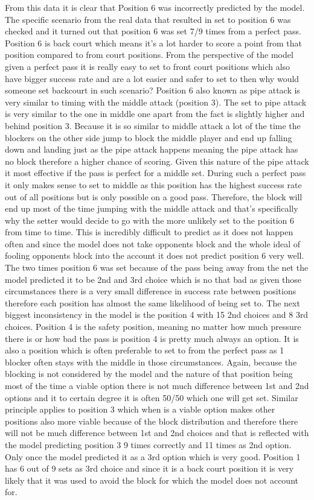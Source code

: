 \documentclass[main.tex]{subfiles}
\begin{document}
From this data it is clear that Position 6 was incorrectly predicted by the model. The specific scenario from the real data that resulted in set to position 6 was checked and it turned out that position 6 was set 7/9 times from a perfect pass. Position 6 is back court which means it’s a lot harder to score a point from that position compared to from court positions. From the perspective of the model given a perfect pass it is really easy to set to front court positions which also have bigger success rate and are a lot easier and safer to set to then why would someone set backcourt in such scenario? Position 6 also known as pipe attack is very similar to timing with the middle attack (position 3). The set to pipe attack is very similar to the one in middle one apart from the fact is slightly higher and behind position 3. Because it is so similar to middle attack a lot of the time the blockers on the other side jump to block the middle player and end up falling down and landing just as the pipe attack happens meaning the pipe attack has no block therefore a higher chance of scoring. Given this nature of the pipe attack it most effective if the pass is perfect for a middle set. During such a perfect pass it only makes sense to set to middle as this position has the highest success rate out of all positions but is only possible on a good pass. Therefore, the block will end up most of the time jumping with the middle attack and that’s specifically why the setter would decide to go with the more unlikely set to the position 6 from time to time. This is incredibly difficult to predict as it does not happen often and since the model does not take opponents block and the whole ideal of fooling opponents block into the account it does not predict position 6 very well. The two times position 6 was set because of the pass being away from the net the model predicted it to be 2nd and 3rd choice which is no that bad as given those circumstances there is a very small difference in success rate between positions therefore each position has almost the same likelihood of being set to.  The next biggest inconsistency in the model is the position 4 with 15 2nd choices and 8 3rd choices. Position 4 is the safety position, meaning no matter how much pressure there is or how bad the pass is position 4 is pretty much always an option. It is also a position which is often preferable to set to from the perfect pass as 1 blocker often stays with the middle in those circumstances. Again, because the blocking is not considered by the model and the nature of that position being most of the time a viable option there is not much difference between 1st and 2nd options and it to certain degree it is often 50/50 which one will get set. Similar principle applies to position 3 which when is a viable option makes other positions also more viable because of the block distribution and therefore there will not be much difference between 1st and 2nd choices and that is reflected with the model predicting position 3 9 times correctly and 11 times as 2nd option. Only once the model predicted it as a 3rd option which is very good. Position 1 has 6 out of 9 sets as 3rd choice and since it is a back court position it is very likely that it was used to avoid the block for which the model does not account for. 
\end{document}
